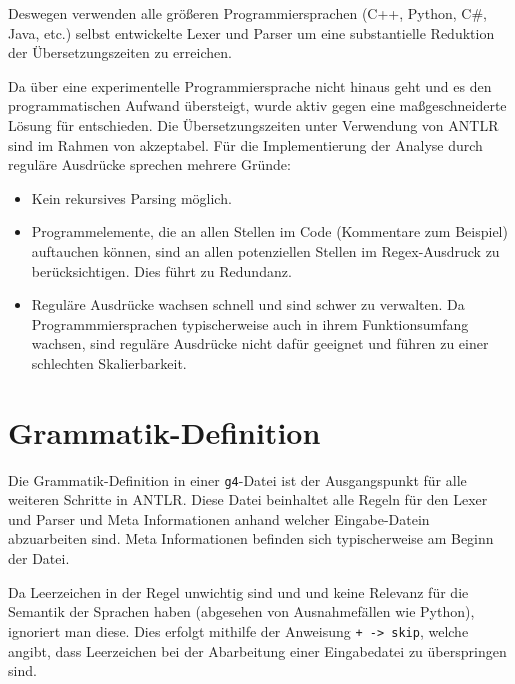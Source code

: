 Deswegen verwenden alle größeren Programmiersprachen (C++, Python, C\#, Java, etc.) selbst entwickelte Lexer und Parser um eine substantielle Reduktion der Übersetzungszeiten zu erreichen.

Da \toya über eine experimentelle Programmiersprache nicht hinaus geht und es den programmatischen Aufwand übersteigt, wurde aktiv gegen eine maßgeschneiderte Lösung für \toya entschieden. Die Übersetzungszeiten unter Verwendung von ANTLR sind im Rahmen von \toya akzeptabel. Für die Implementierung der Analyse durch reguläre Ausdrücke sprechen mehrere Gründe:
\begin{itemize}
    \item Kein rekursives Parsing möglich.
    \item Programmelemente, die an allen Stellen im Code (Kommentare zum Beispiel) auftauchen können, sind an allen potenziellen Stellen im Regex-Ausdruck zu berücksichtigen. Dies führt zu Redundanz.
    \item Reguläre Ausdrücke wachsen schnell und sind schwer zu verwalten. Da Programmmiersprachen typischerweise auch in ihrem Funktionsumfang wachsen, sind reguläre Ausdrücke nicht dafür geeignet und führen zu einer schlechten Skalierbarkeit.
\end{itemize}


\section{Grammatik-Definition}

Die Grammatik-Definition in einer \texttt{g4}-Datei ist der Ausgangspunkt für alle weiteren Schritte in ANTLR. Diese Datei beinhaltet alle Regeln für den Lexer und Parser und Meta Informationen anhand welcher Eingabe-Datein abzuarbeiten sind. Meta Informationen befinden sich typischerweise am Beginn der Datei.

Da Leerzeichen in der Regel unwichtig sind und und keine Relevanz für die Semantik der Sprachen haben (abgesehen von Ausnahmefällen wie Python), ignoriert man diese. Dies erfolgt mithilfe der Anweisung \texttt{+ -> skip}, welche angibt, dass Leerzeichen bei der Abarbeitung einer Eingabedatei zu überspringen sind.

